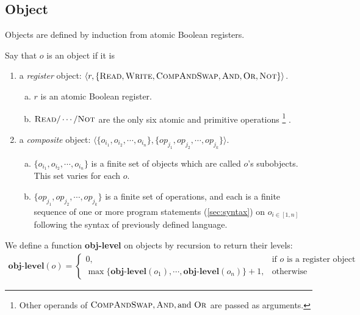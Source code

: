 \documentclass[a4paper,USenglish]{lipics-v2016}
\newcommand{\objlevel}{\textbf{obj-level}}
\begin{document}
\subsection{Object}\label{sec:object}
Objects are defined by induction from atomic Boolean registers.
\begin{definition}\label{def_object}
	Say that $o$ is an object if it is
	\begin{enumerate}[(1)]
		\item
		a \textit{register} object: $\langle r, \{
		\text{\sc{Read}}, \text{\sc{Write}}, \text{\sc{CompAndSwap}}
		, \text{\sc{And}}, \text{\sc{Or}}, \text{\sc{Not}}
		\} \rangle$.
		\begin{enumerate}[(a)]
			\item
			$r$ is an atomic Boolean register.
			\item
			$\text{\sc{Read}}/\cdots/\text{\sc{Not}}$
			are the only six atomic and primitive operations
			\footnote
			{
				Other operands of $\text{\sc{CompAndSwap}}, \text{\sc{And}}, \text{and } \text{\sc{Or}}$ are passed as arguments.
			}
			.
		\end{enumerate}
		\item
		a \textit{composite} object: $\langle \{o_{i_1}, o_{i_2}, \cdots, o_{i_n}\}, \{op_{j_1}, op_{j_2}, \cdots, op_{j_k}\}\rangle$.
		\begin{enumerate}[(a)]
			\item
			$\{o_{i_1}, o_{i_2}, \cdots, o_{i_n}\}$ is a finite set of objects which are called $o$'s subobjects.
			This set varies for each $o$.
			\item
			$\{op_{j_1}, op_{j_2}, \cdots, op_{j_k}\}$ is a finite set of operations,
			and each is a finite sequence of one or more program statements
			(\ref{sec:syntax}) on $o_{i \in [1, n]}$ following the syntax of previously defined language.
		\end{enumerate}
	\end{enumerate}	
\end{definition}

We define a function {\objlevel} on objects by recursion to return their levels:
\begin{align*}
	{\objlevel}(o) = 
	\begin{cases}
		0, & \mbox{if } o \text{ is a register object} \\
		\displaystyle{\max\{{\objlevel}(o_1), \cdots, {\objlevel}(o_n)\} + 1}, & \mbox{otherwise}
	\end{cases}
\end{align*}
\end{document}
